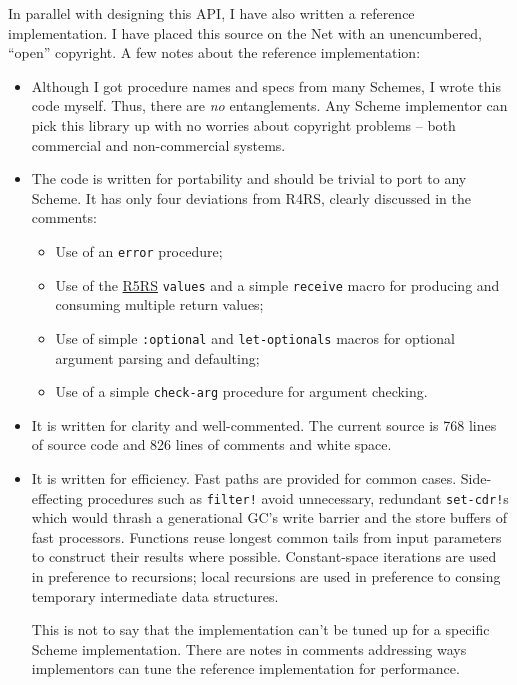In parallel with designing this API, I have also written a reference
implementation. I have placed this source on the Net with an
unencumbered, ``open'' copyright. A few notes about the reference
implementation:

\begin{itemize}
\tightlist
\item
  Although I got procedure names and specs from many Schemes, I wrote
  this code myself. Thus, there are \emph{no} entanglements. Any Scheme
  implementor can pick this library up with no worries about copyright
  problems -- both commercial and non-commercial systems.
\item
  The code is written for portability and should be trivial to port to
  any Scheme. It has only four deviations from R4RS, clearly discussed
  in the comments:

  \begin{itemize}
  \tightlist
  \item
    Use of an \texttt{error} procedure;
  \item
    Use of the \protect\hyperlink{R5RS}{R5RS} \texttt{values} and a
    simple \texttt{receive} macro for producing and consuming multiple
    return values;
  \item
    Use of simple \texttt{:optional} and \texttt{let-optionals} macros
    for optional argument parsing and defaulting;
  \item
    Use of a simple \texttt{check-arg} procedure for argument checking.
  \end{itemize}
\item
  It is written for clarity and well-commented. The current source is
  768 lines of source code and 826 lines of comments and white space.
\item
  It is written for efficiency. Fast paths are provided for common
  cases. Side-effecting procedures such as \texttt{filter!} avoid
  unnecessary, redundant \texttt{set-cdr!}s which would thrash a
  generational GC's write barrier and the store buffers of fast
  processors. Functions reuse longest common tails from input parameters
  to construct their results where possible. Constant-space iterations
  are used in preference to recursions; local recursions are used in
  preference to consing temporary intermediate data structures.

  This is not to say that the implementation can't be tuned up for a
  specific Scheme implementation. There are notes in comments addressing
  ways implementors can tune the reference implementation for
  performance.
\end{itemize}

